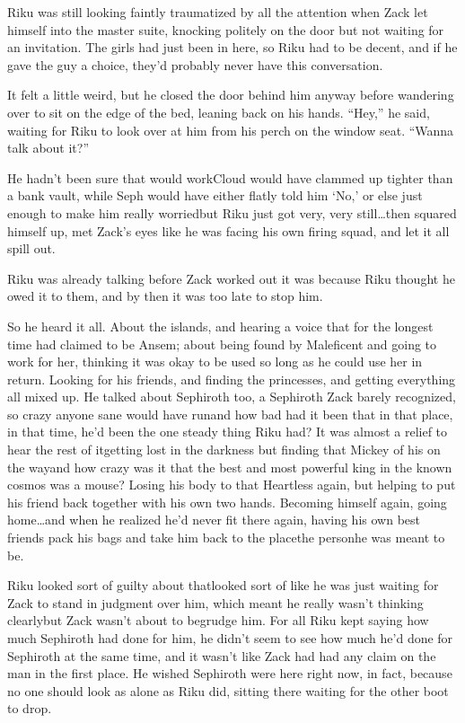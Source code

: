 Riku was still looking faintly traumatized by all the attention when Zack let himself into the master suite, knocking politely on the door but not waiting for an invitation. The girls had just been in here, so Riku had to be decent, and if he gave the guy a choice, they'd probably never have this conversation.

It felt a little weird, but he closed the door behind him anyway before wandering over to sit on the edge of the bed, leaning back on his hands. ``Hey,'' he said, waiting for Riku to look over at him from his perch on the window seat. ``Wanna talk about it?''

He hadn't been sure that would work\textemdash Cloud would have clammed up tighter than a bank vault, while Seph would have either flatly told him `No,' or else just enough to make him really worried\textemdash but Riku just got very, very still\ldots then squared himself up, met Zack's eyes like he was facing his own firing squad, and let it all spill out.

Riku was already talking before Zack worked out it was because Riku thought he owed it to them, and by then it was too late to stop him.

So he heard it all. About the islands, and hearing a voice that for the longest time had claimed to be Ansem; about being found by Maleficent and going to work for her, thinking it was okay to be used so long as he could use her in return. Looking for his friends, and finding the princesses, and getting everything all mixed up. He talked about Sephiroth too, a Sephiroth Zack barely recognized, so crazy anyone sane would have run\textemdash and how bad had it been that in that place, in that time, he'd been the one steady thing Riku had? It was almost a relief to hear the rest of it\textemdash getting lost in the darkness but finding that Mickey of his on the way\textemdash and how crazy was it that the best and most powerful king in the known cosmos was a mouse? Losing his body to that Heartless again, but helping to put his friend back together with his own two hands. Becoming himself again, going home\ldots and when he realized he'd never fit there again, having his own best friends pack his bags and take him back to the place\textemdash the person\textemdash he was meant to be.

Riku looked sort of guilty about that\textemdash looked sort of like he was just waiting for Zack to stand in judgment over him, which meant he really wasn't thinking clearly\textemdash but Zack wasn't about to begrudge him. For all Riku kept saying how much Sephiroth had done for him, he didn't seem to see how much he'd done for Sephiroth at the same time, and it wasn't like Zack had had any claim on the man in the first place. He wished Sephiroth were here right now, in fact, because no one should look as alone as Riku did, sitting there waiting for the other boot to drop.

